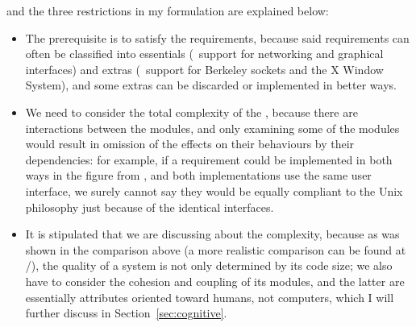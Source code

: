 and the three restrictions in my formulation are explained below:
\begin{itemize}
\item The prerequisite is to  satisfy the requirements,
	because said requirements can often be classified into essentials
	(\eg~support for networking and graphical interfaces) and extras
	(\eg~support for Berkeley sockets and the X Window System),
	and some extras can be discarded or implemented in better ways.
\item We need to consider the total complexity of the , because
	there are interactions between the modules, and only examining some of the
	modules would result in omission of the effects on their behaviours by
	their dependencies: for example, if a requirement could be implemented in	
	both ways in the figure from \parencite{litt2014a}, and both implementations
	use the same user interface, we surely cannot say they would be equally
	compliant to the Unix philosophy just because of the identical interfaces.
\item It is stipulated that we are discussing about the 
	complexity, because as was shown in the comparison above (a more realistic
	comparison can be found at \parencite{github:acmetiny}/\parencite%
	{gitea:emca}), the quality of a system is not only determined by its code
	size; we also have to consider the cohesion and coupling of its modules,
	and the latter are essentially attributes oriented toward humans, not
	computers, which I will further discuss in Section~\ref{sec:cognitive}.
\end{itemize}

